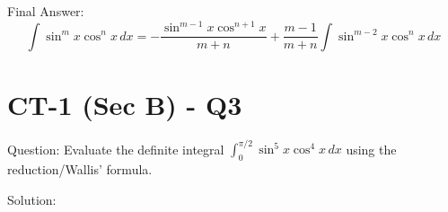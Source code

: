 \documentclass[11pt, a4paper]{article}
\begin{document}
Final Answer:
\[ 
\boxed{\int \sin^m x \cos^n x \, dx = -\frac{\sin^{m-1} x \cos^{n+1} x}{m+n} + \frac{m-1}{m+n} \int \sin^{m-2} x \cos^n x \, dx} 
\]



\section*{CT-1 (Sec B) - Q3}

Question:
Evaluate the definite integral $\int_{0}^{\pi/2} \sin^5 x \cos^4 x \, dx$ using the reduction/Wallis' formula.

Solution:
\end{document}

